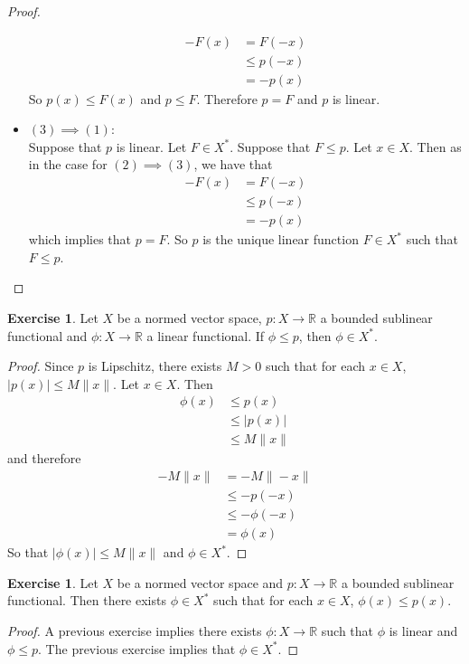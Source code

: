 \documentclass[12pt]{amsart}
\theoremstyle{definition}
\newtheorem{ex}[definition]{Exercise}
\newcommand{\R}{\mathbb{R}}
\begin{document}
\begin{proof}
\begin{itemize}
\begin{align*}
	-F(x) 
	&= F(-x) \\
	& \leq p(-x) \\
	&= -p(x)
\end{align*}	
	So $p(x) \leq F(x)$ and $p \leq F$. Therefore $p = F$ and $p$ is linear.  
	\item $(3) \implies (1)$: \\ 
	Suppose that $p$ is linear. Let $F \in X^*$. Suppose that $F \leq p$. Let $x \in X$. Then as in the case for $(2) \implies (3)$, we have that
	\begin{align*}
	-F(x) 
	&= F(-x) \\
	& \leq p(-x) \\
	&= -p(x)
	\end{align*}	 
	which implies that $p = F$. So $p$ is the unique linear function $F \in X^*$ such that $F \leq p$.
	\end{itemize}
	\end{proof}
	
	\begin{ex}
	Let $X$ be a normed vector space, $p:X \rightarrow \R$ a bounded sublinear functional and $\phi:X \rightarrow \R$ a linear functional. If $\phi \leq p$, then $\phi \in X^*$. 
	\end{ex}
	
	\begin{proof}
	Since $p$ is Lipschitz, there exists $M >0$ such that for each $x \in X$, $|p(x)| \leq M \|x\|$. Let $x \in X$. Then 
	\begin{align*}
	\phi(x) 
	&\leq p(x) \\
	&\leq |p(x)| \\
	&\leq M \|x\| 
	\end{align*}
	and therefore  
	\begin{align*}
	- M \|x\| 
	&= -M \|-x\| \\
	& \leq -p(-x) \\
	& \leq - \phi(-x) \\
	&= \phi(x) 
	\end{align*}
	So that $|\phi(x)| \leq  M\|x\|$ and $\phi \in X^*$.
	\end{proof}
	
	\begin{ex}
	Let $X$ be a normed vector space and $p:X \rightarrow \R$ a bounded sublinear functional. Then there exists $\phi \in X^*$ such that for each $x \in X$, $\phi(x) \leq p(x)$.
	\end{ex}
	
	\begin{proof}
	A previous exercise implies there exists $\phi: X \rightarrow \R$ such that $\phi$ is linear and $\phi \leq p$. The previous exercise implies that $\phi \in X^*$.
	\end{proof}
	
\end{document}
